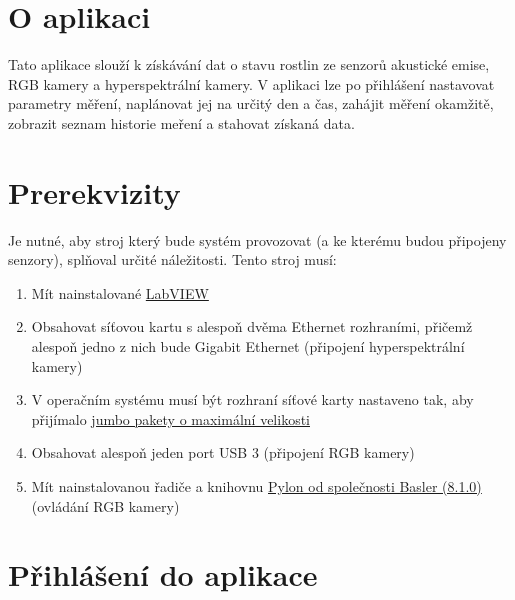 \documentclass[12pt]{article}
\begin{document}
    \begin{teamwork}

        \section{O aplikaci}\label{sec:o-aplikace}

        Tato aplikace slouží k získávání dat o stavu rostlin ze senzorů akustické emise, RGB kamery a hyperspektrální kamery.
        V aplikaci lze po přihlášení nastavovat parametry měření, naplánovat jej na určitý den a čas, zahájit měření okamžitě, zobrazit seznam historie meření a stahovat získaná data.

        \section{Prerekvizity}\label{sec:prerekvizity}

        Je nutné, aby stroj který bude systém provozovat (a ke kterému budou připojeny senzory), splňoval určité náležitosti.
        Tento stroj musí:

        \begin{enumerate}
            \item Mít nainstalované \href{https://www.ni.com/en/support/downloads/software-products/download.labview.html#559067}{LabVIEW}
            \item Obsahovat síťovou kartu s alespoň dvěma Ethernet rozhraními, přičemž alespoň jedno z
            nich bude Gigabit Ethernet (připojení hyperspektrální kamery)
            \item V operačním systému musí být rozhraní síťové karty nastaveno tak, aby přijímalo \href{https://docs.adaptive-vision.com/4.7/studio/technical_issues/gigevision/EnablingJumboPackets.html}{jumbo pakety o maximální velikosti}
            \item Obsahovat alespoň jeden port USB 3 (připojení RGB kamery)
            \item Mít nainstalovanou řadiče a knihovnu \href{https://www.baslerweb.com/en/downloads/software/?downloadCategory.values.label.data=pylon}{Pylon od společnosti Basler (8.1.0)} (ovládání RGB kamery)
        \end{enumerate}


        \section{Přihlášení do aplikace}\label{sec:prihlaseni-do-aplikace}


\end{teamwork}
\end{document}
